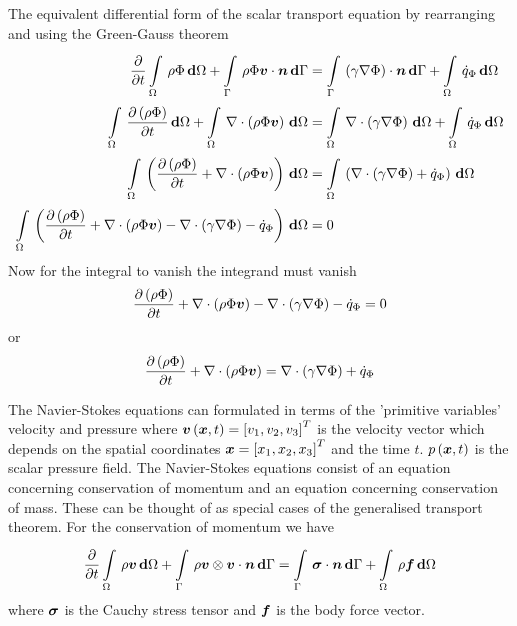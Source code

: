 The equivalent differential form of the scalar transport equation by
rearranging  and using the Green-Gauss
theorem \ie
\begin{equation}
  \begin{split}
    \delby{}{t}\gint{\Omega}{}{\rho\Phi}{\Omega}+\gint{\Gamma}{}{\dotprod{\rho\Phi\vectr{v}}{\vectr{n}}}{\Gamma}
    &=\gint{\Gamma}{}{\dotprod{\pbrac{\gamma\gradient{}{\Phi}}}{\vectr{n}}}{\Gamma}+\gint{\Omega}{}{\dot{q}_{\Phi}}{\Omega}\\
    \gint{\Omega}{}{\delby{\pbrac{\rho\Phi}}{t}}{\Omega}+\gint{\Omega}{}{\divergence{}{\pbrac{\rho\Phi\vectr{v}}}}{\Omega}
    &=\gint{\Omega}{}{\divergence{}{\pbrac{\gamma\gradient{}{\Phi}}}}{\Omega}+\gint{\Omega}{}{\dot{q}_{\Phi}}{\Omega}
    \\
    \gint{\Omega}{}{\pbrac{\delby{\pbrac{\rho\Phi}}{t}+\divergence{}{\pbrac{\rho\Phi\vectr{v}}}}}{\Omega}
    &=\gint{\Omega}{}{\pbrac{\divergence{}{\pbrac{\gamma\gradient{}{\Phi}}}+\dot{q}_{\Phi}}}{\Omega}
    \\
    \gint{\Omega}{}{\pbrac{\delby{\pbrac{\rho\Phi}}{t}+\divergence{}{\pbrac{\rho\Phi\vectr{v}}}-
        \divergence{}{\pbrac{\gamma\gradient{}{\Phi}}}-\dot{q}_{\Phi}}}{\Omega}
    &= 0
  \end{split}
\end{equation}
Now for the integral to vanish the integrand must vanish \ie
\begin{equation}
  \delby{\pbrac{\rho\Phi}}{t}+\divergence{}{\pbrac{\rho\Phi\vectr{v}}}
  -\divergence{}{\pbrac{\gamma\gradient{}{\Phi}}}-\dot{q}_{\Phi}=0
\end{equation}
or
\begin{equation}
  \delby{\pbrac{\rho\Phi}}{t}+\divergence{}{\pbrac{\rho\Phi\vectr{v}}}=\divergence{}{\pbrac{\gamma\gradient{}{\Phi}}}+\dot{q}_{\Phi}
  \label{eqn:differentialgenscalartransport}
\end{equation}

The Navier-Stokes equations can formulated in terms of the 'primitive
variables' \ie velocity and pressure where
$ \boldsymbol{v}\left( \boldsymbol{x},t \right) ={\left[ v_{1},v_{2},v_{3} \right]}^{T}$ is the
velocity vector which depends on the spatial coordinates
$\boldsymbol{x}={\left[ x_{1},x_{2},x_{3} \right]}^{T}$ and the time
$t$. $ p\left( \boldsymbol{x},t \right) $ is the scalar pressure field. The Navier-Stokes
equations consist of an equation concerning conservation of momentum and an
equation concerning conservation of mass. These can be thought of as special
cases of the generalised transport theorem. For the conservation of momentum
we have
\begin{equation}
   \dfrac{\partial }{\partial t}   \displaystyle\int\limits_{\Omega}^{} \,\rho\boldsymbol{v}\, \boldsymbol{\mathrm{d}} \Omega 
  +  \displaystyle\int\limits_{\Gamma}^{} \, \rho\boldsymbol{v} \otimes \boldsymbol{v} \cdot\boldsymbol{n}\, \boldsymbol{\mathrm{d}} \Gamma 
  =  \displaystyle\int\limits_{\Gamma}^{} \,\boldsymbol{\mathit{\sigma}}\cdot\boldsymbol{n}\, \boldsymbol{\mathrm{d}} \Gamma +  \displaystyle\int\limits_{\Omega}^{} \,\rho\boldsymbol{f}\, \boldsymbol{\mathrm{d}} \Omega 
\end{equation}
where $\boldsymbol{\mathit{\sigma}}$ is the Cauchy stress tensor and $\boldsymbol{f}$ is the body force
vector.

